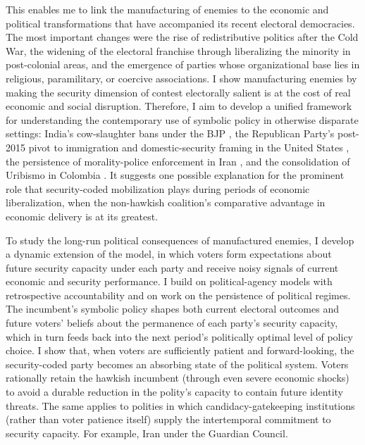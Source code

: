 \documentclass[11pt,twoside]{extarticle}
\begin{document}

This enables me to link the manufacturing of enemies to the economic and political transformations that have accompanied its recent electoral democracies. The most important changes were the rise of redistributive politics after the Cold War, the widening of the electoral franchise through liberalizing the minority in post-colonial areas, and the emergence of parties whose organizational base lies in religious, paramilitary, or coercive associations. I show manufacturing enemies by making the security dimension of contest electorally salient is at the cost of real economic and social disruption. Therefore, I aim to develop a unified framework for understanding the contemporary use of symbolic policy in otherwise disparate settings: India's cow-slaughter bans under the BJP \citep{jaffrelotModisIndiaHindu2021}, the Republican Party's post-2015 pivot to immigration and domestic-security framing in the United States \citep{sidesIdentityCrisis20162019,mutzStatusThreatNot2018}, the persistence of morality-police enforcement in Iran \citep{bajoghliIranReframedAnxieties2020}, and the consolidation of Uribismo in Colombia \citep*{acemogluMonopolyViolenceEvidence2013}. It suggests one possible explanation for the prominent role that security-coded mobilization plays during periods of economic liberalization, when the non-hawkish coalition's comparative advantage in economic delivery is at its greatest.


To study the long-run political consequences of manufactured enemies, I develop a dynamic extension of the model, in which voters form expectations about future security capacity under each party and receive noisy signals of current economic and security performance. I build on political-agency models with retrospective accountability and on work on the persistence of political regimes. The incumbent's symbolic policy shapes both current electoral outcomes and future voters' beliefs about the permanence of each party's security capacity, which in turn feeds back into the next period's politically optimal level of policy choice. I show that, when voters are sufficiently patient and forward-looking, the security-coded party becomes an absorbing state of the political system. Voters rationally retain the hawkish incumbent (through even severe economic shocks) to avoid a durable reduction in the polity's capacity to contain future identity threats. The same applies to polities in which candidacy-gatekeeping institutions (rather than voter patience itself) supply the intertemporal commitment to security capacity. For example, Iran under the Guardian Council.
\end{document}
